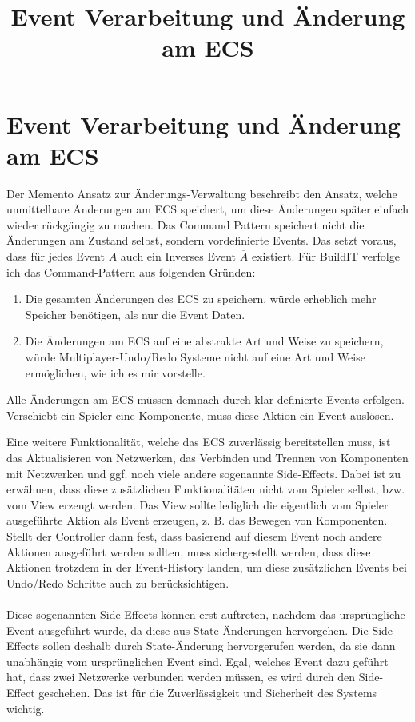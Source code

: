 \documentclass[11pt]{article}
\title{Event Verarbeitung und Änderung am ECS}
\begin{document}
    \section{Event Verarbeitung und Änderung am ECS}
    Der Memento Ansatz zur Änderungs-Verwaltung beschreibt den Ansatz, welche unmittelbare Änderungen
    am ECS speichert, um diese Änderungen später einfach wieder rückgängig zu machen.
    Das Command Pattern speichert nicht die Änderungen am Zustand selbst, sondern vordefinierte Events.
    Das setzt voraus, dass für jedes Event $A$ auch ein Inverses Event $\overline{A}$ existiert.
    Für BuildIT verfolge ich das Command-Pattern aus folgenden Gründen:
    \begin{enumerate}
        \item Die gesamten Änderungen des ECS zu speichern, würde erheblich mehr Speicher benötigen, als nur die Event Daten.
        \item Die Änderungen am ECS auf eine abstrakte Art und Weise zu speichern, würde Multiplayer-Undo/Redo Systeme nicht
              auf eine Art und Weise ermöglichen, wie ich es mir vorstelle.
    \end{enumerate}
    Alle Änderungen am ECS müssen demnach durch klar definierte Events erfolgen.
    Verschiebt ein Spieler eine Komponente, muss diese Aktion ein Event auslösen.

    Eine weitere Funktionalität, welche das ECS zuverlässig bereitstellen muss,
    ist das Aktualisieren von Netzwerken,
    das Verbinden und Trennen von Komponenten mit Netzwerken
    und ggf. noch viele andere sogenannte Side-Effects.
    Dabei ist zu erwähnen, dass diese zusätzlichen Funktionalitäten
    nicht vom Spieler selbst, bzw. vom View erzeugt werden.
    Das View sollte lediglich die eigentlich vom Spieler ausgeführte
    Aktion als Event erzeugen, z. B. das Bewegen von Komponenten.
    Stellt der Controller dann fest, dass basierend auf diesem Event
    noch andere Aktionen ausgeführt werden
    sollten, muss sichergestellt werden, dass diese Aktionen trotzdem
    in der Event-History landen, um diese zusätzlichen
    Events bei Undo/Redo Schritte auch zu berücksichtigen.

    \paragraph{}
    Diese sogenannten Side-Effects können erst auftreten, nachdem das ursprüngliche Event ausgeführt wurde, da diese aus
    State-Änderungen hervorgehen.
    Die Side-Effects sollen deshalb durch State-Änderung hervorgerufen werden,
    da sie dann unabhängig vom ursprünglichen Event sind.
    Egal, welches Event dazu geführt hat, dass zwei Netzwerke verbunden werden müssen,
    es wird durch den Side-Effect geschehen.
    Das ist für die Zuverlässigkeit und Sicherheit des Systems wichtig.
\end{document}
